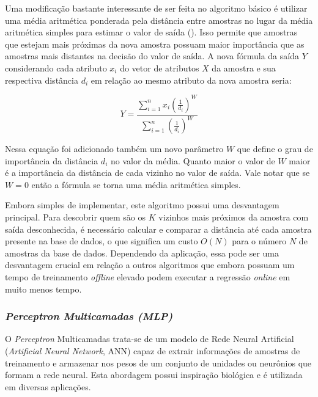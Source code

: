 \documentclass[12pt]{article}
\begin{document}
            Uma modificação bastante interessante de ser feita no algoritmo básico é utilizar uma média aritmética ponderada pela distância entre amostras no lugar da média aritmética simples para estimar o valor de saída (\cite{wknn2004}). Isso permite que amostras que estejam mais próximas da nova amostra possuam maior importância que as amostras mais distantes na decisão do valor de saída. A nova fórmula da saída $Y$ considerando cada atributo $x_i$ do vetor de atributos $X$ da amostra e sua respectiva distância $d_i$ em relação ao mesmo atributo da nova amostra seria:
            
            \begin{equation} 
            \label{eq:mediaPonderada}
            Y = \frac{\sum_{i=1}^{n} x_i (\frac{1}{d_i})^W}
                {\sum_{i=1}^{n} (\frac{1}{d_i})^W}
            \end{equation}
            
            \noindent Nessa equação foi adicionado também um novo parâmetro $W$ que define o grau de importância da distância $d_i$ no valor da média. Quanto maior o valor de $W$ maior é a importância da distância de cada vizinho no valor de saída. Vale notar que se $W = 0$ então a fórmula se torna uma média aritmética simples.
            
            Embora simples de implementar, este algoritmo possui uma  desvantagem principal. Para descobrir quem são os $K$ vizinhos mais próximos da amostra com saída desconhecida, é necessário calcular e comparar a distância até cada amostra presente na base de dados, o que significa um custo $O(N)$ para o número $N$ de amostras da base de dados. Dependendo da aplicação, essa pode ser uma desvantagem crucial em relação a outros algoritmos que embora possuam um tempo de treinamento \textit{offline} elevado podem executar a regressão \textit{online} em muito menos tempo.  
            
            \subsubsection{\textit{Perceptron Multicamadas (MLP)}}
            \label{sec:MLP}

            O \textit{Perceptron} Multicamadas trata-se de um modelo de Rede Neural Artificial (\textit{Artificial Neural Network}, ANN) capaz de extrair informações de amostras de treinamento e armazenar nos pesos de um conjunto de unidades ou neurônios que formam a rede neural. Esta abordagem possui inspiração biológica e é utilizada em diversas aplicações.
            
\end{document}
